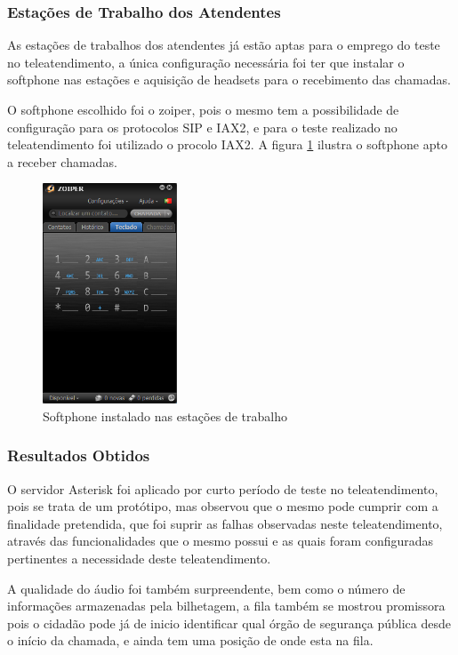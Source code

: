 \subsubsection{Estações de Trabalho dos Atendentes}
As estações de trabalhos dos atendentes já estão aptas para o emprego do teste no teleatendimento, a única configuração necessária foi ter que instalar o softphone nas estações e aquisição de headsets para o recebimento das chamadas.

O softphone escolhido foi o zoiper, pois o mesmo tem a possibilidade de configuração para os protocolos SIP e IAX2, e para o teste realizado no teleatendimento foi utilizado o procolo IAX2. A figura \ref{Figura30} ilustra o softphone apto a receber chamadas.

\begin{figure}[h]
	\centering
	\includegraphics[width=4cm]{imagens/zoiper.png}
	\caption{Softphone instalado nas estações de trabalho}
    \label{Figura30}
\end{figure}

\subsubsection{Resultados Obtidos}
O servidor Asterisk foi aplicado por curto período de teste no teleatendimento, pois se trata de um protótipo, mas observou que o mesmo pode cumprir com a finalidade pretendida, que foi suprir as falhas observadas neste teleatendimento, através das funcionalidades que o mesmo possui e as quais foram configuradas pertinentes a necessidade deste teleatendimento.

A qualidade do áudio foi também surpreendente, bem como o número de informações armazenadas pela bilhetagem, a fila também se mostrou promissora pois o cidadão pode já de inicio identificar qual órgão de segurança pública desde o início da chamada, e ainda tem uma posição de onde esta na fila.
